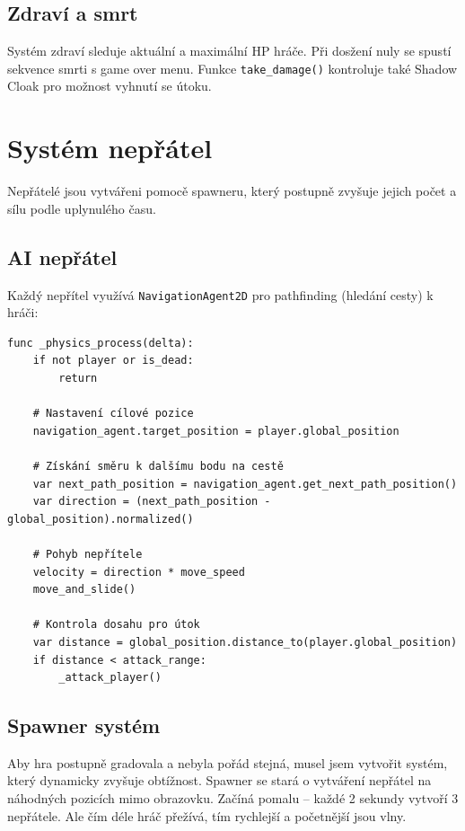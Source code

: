 \documentclass[12pt, a4paper,
oneside
]{report}
\begin{document}
	\subsection{Zdraví a smrt}
	
	Systém zdraví sleduje aktuální a maximální HP hráče. Při dosžení nuly se spustí sekvence smrti s game over menu. Funkce \texttt{take\_damage()} kontroluje také Shadow Cloak pro možnost vyhnutí se útoku.

	\section{Systém nepřátel}
	
	Nepřátelé jsou vytvářeni pomocě spawneru, který postupně zvyšuje jejich počet a sílu podle uplynulého času.
	
	\subsection{AI nepřátel}
	\nopagebreak
	
	Každý nepřítel využívá \texttt{NavigationAgent2D} pro pathfinding (hledání cesty) k hráči:
	\nopagebreak
	
\begin{lstlisting}[style=GDScript, caption={AI nepřítele}]
func _physics_process(delta):
	if not player or is_dead:
		return
	
	# Nastavení cílové pozice
	navigation_agent.target_position = player.global_position
	
	# Získání směru k dalšímu bodu na cestě
	var next_path_position = navigation_agent.get_next_path_position()
	var direction = (next_path_position - global_position).normalized()
	
	# Pohyb nepřítele
	velocity = direction * move_speed
	move_and_slide()
	
	# Kontrola dosahu pro útok
	var distance = global_position.distance_to(player.global_position)
	if distance < attack_range:
		_attack_player()
\end{lstlisting}

	\subsection{Spawner systém}
	\nopagebreak
	
	Aby hra postupně gradovala a nebyla pořád stejná, musel jsem vytvořit systém, který dynamicky zvyšuje obtížnost. Spawner se stará o vytváření nepřátel na náhodných pozicích mimo obrazovku. Začíná pomalu -- každé 2 sekundy vytvoří 3 nepřátele. Ale čím déle hráč přežívá, tím rychlejší a početnější jsou vlny.
\end{document}
